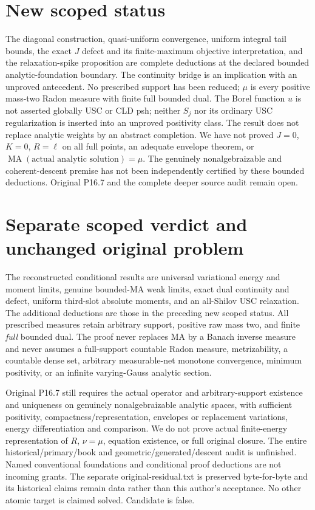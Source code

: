 \documentclass[11pt]{article}
\newcommand{\MA}{\operatorname{MA}}
\begin{document}
\section{New scoped status}
The diagonal construction, quasi-uniform convergence, uniform integral
tail bounds, the exact $J$ defect and its finite-maximum objective
interpretation, and the relaxation-spike proposition are complete
deductions at the declared bounded analytic-foundation boundary.
The continuity bridge is an implication with an unproved antecedent.
No prescribed support has been reduced; $\mu$ is every positive
mass-two Radon measure with finite full bounded dual.
The Borel function $u$ is not asserted globally USC or CLD psh;
neither $S_j$ nor its ordinary USC regularization is inserted into an
unproved positivity class. The result does not replace analytic
weights by an abstract completion. We have not proved $J=0$, $K=0$,
$R=\ell$ on all full points, an adequate envelope theorem, or
$\MA(\text{actual analytic solution})=\mu$.
The genuinely nonalgebraizable and coherent-descent premise has not
been independently certified by these bounded deductions.
Original P16.7 and the complete deeper source audit remain open.

\section{Separate scoped verdict and unchanged original problem}
The reconstructed conditional results are universal variational energy and moment
limits, genuine bounded-MA weak limits, exact dual continuity and defect,
uniform third-slot absolute moments, and an all-Shilov USC relaxation.
The additional deductions are those in the preceding new scoped status.
All prescribed measures retain arbitrary support, positive raw mass two,
and finite \emph{full} bounded dual. The proof never replaces MA by a
Banach inverse measure and never assumes a full-support countable Radon
measure, metrizability, a countable dense set, arbitrary measurable-net
monotone convergence, minimum positivity, or an infinite varying-Gauss
analytic section.

Original P16.7 still requires the actual operator and arbitrary-support
existence and uniqueness on genuinely nonalgebraizable analytic spaces,
with sufficient positivity, compactness/representation, envelopes or
replacement variations, energy differentiation and comparison. We do not
prove actual finite-energy representation of $R$, $\nu=\mu$, equation
existence, or full original closure. The entire historical/primary/book
and geometric/generated/descent audit is unfinished. Named conventional
foundations and conditional proof deductions are not incoming grants.
The separate original-residual.txt is preserved byte-for-byte and its
historical claims remain data rather than this author's acceptance.
No other atomic target is claimed solved. Candidate is false.
\end{document}
